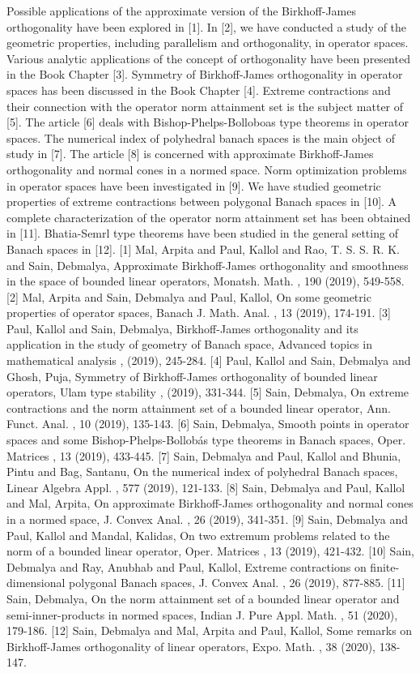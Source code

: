 Possible applications of the approximate version of the Birkhoff-James orthogonality have been explored in [1]. In [2], we have conducted a study of the geometric properties, including parallelism and orthogonality, in operator spaces. Various analytic applications of the concept of orthogonality have been presented in the Book Chapter [3]. Symmetry of Birkhoff-James orthogonality in operator spaces has been discussed in the Book Chapter [4]. Extreme contractions and their connection with the operator norm attainment set is the subject matter of [5]. The article [6] deals with Bishop-Phelps-Bolloboas type theorems in operator spaces. The numerical index of polyhedral banach spaces is the main object of study in [7]. The article [8] is concerned with approximate Birkhoff-James orthogonality and normal cones in a normed space. Norm optimization problems in operator spaces have been investigated in [9]. We have studied geometric properties of extreme contractions between polygonal Banach spaces in [10]. A complete characterization of the operator norm attainment set has been obtained in [11]. Bhatia-Semrl type theorems have been studied in the general setting of Banach spaces in [12].    [1] Mal, Arpita and Paul, Kallol and Rao, T. S. S. R. K. and Sain, Debmalya, Approximate Birkhoff-James orthogonality and smoothness in the space of bounded linear operators, Monatsh. Math. , 190 (2019), 549-558.  [2] Mal, Arpita and Sain, Debmalya and Paul, Kallol, On some geometric properties of operator spaces, Banach J. Math. Anal. , 13 (2019), 174-191.   [3] Paul, Kallol and Sain, Debmalya, Birkhoff-James orthogonality and its application in the study of geometry of Banach space, Advanced topics in mathematical analysis , (2019), 245-284.  [4] Paul, Kallol and Sain, Debmalya and Ghosh, Puja, Symmetry of Birkhoff-James orthogonality of bounded linear operators, Ulam type stability , (2019), 331-344.  [5] Sain, Debmalya, On extreme contractions and the norm attainment set of a bounded linear operator, Ann. Funct. Anal. , 10 (2019), 135-143.  [6] Sain, Debmalya, Smooth points in operator spaces and some Bishop-Phelps-Bollobás type theorems in Banach spaces, Oper. Matrices , 13 (2019), 433-445.  [7] Sain, Debmalya and Paul, Kallol and Bhunia, Pintu and Bag, Santanu, On the numerical index of polyhedral Banach spaces, Linear Algebra Appl. , 577 (2019), 121-133.  [8] Sain, Debmalya and Paul, Kallol and Mal, Arpita, On approximate Birkhoff-James orthogonality and normal cones in a normed space, J. Convex Anal. , 26 (2019), 341-351.  [9] Sain, Debmalya and Paul, Kallol and Mandal, Kalidas, On two extremum problems related to the norm of a bounded linear operator, Oper. Matrices , 13 (2019), 421-432.  [10] Sain, Debmalya and Ray, Anubhab and Paul, Kallol, Extreme contractions on finite-dimensional polygonal Banach spaces, J. Convex Anal. , 26 (2019), 877-885.  [11] Sain, Debmalya, On the norm attainment set of a bounded linear operator and semi-inner-products in normed spaces, Indian J. Pure Appl. Math. , 51 (2020), 179-186.  [12] Sain, Debmalya and Mal, Arpita and Paul, Kallol, Some remarks on Birkhoff-James orthogonality of linear operators, Expo. Math. , 38 (2020), 138-147. 